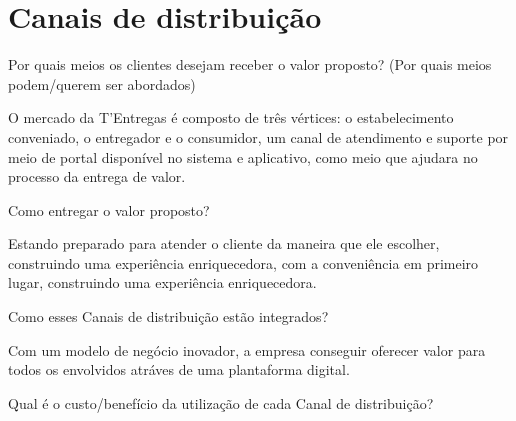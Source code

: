 \section{\textbf{Canais de distribuição}}
\label{sec: Canais de distribuição}

\begin{commentA} \vspace{0.3cm} \noindent Por quais meios os clientes desejam receber o valor proposto? (Por quais meios podem/querem ser abordados) \par \vspace{0.1cm} \end{commentA}

O mercado da T'Entregas é composto de três vértices: o estabelecimento conveniado, o entregador e o consumidor,  um canal de atendimento e suporte por meio de portal disponível no sistema e aplicativo, como meio que ajudara no processo da entrega de valor.\par

\begin{commentA} \vspace{0.3cm} \noindent Como entregar o valor proposto? \par \vspace{0.1cm} \end{commentA}


Estando preparado para atender o cliente da maneira que ele escolher, construindo uma experiência enriquecedora, com a conveniência em primeiro lugar, construindo uma experiência enriquecedora.\par

\begin{commentA} \vspace{0.3cm} \noindent Como esses Canais de distribuição estão integrados? \par \vspace{0.1cm} \end{commentA}


Com um modelo de negócio inovador, a empresa conseguir oferecer valor para todos os envolvidos atráves de uma plantaforma digital.\par

\begin{commentA} \vspace{0.3cm} \noindent Qual é o custo/benefício da utilização de cada Canal de distribuição? \par \vspace{0.1cm} \end{commentA}


